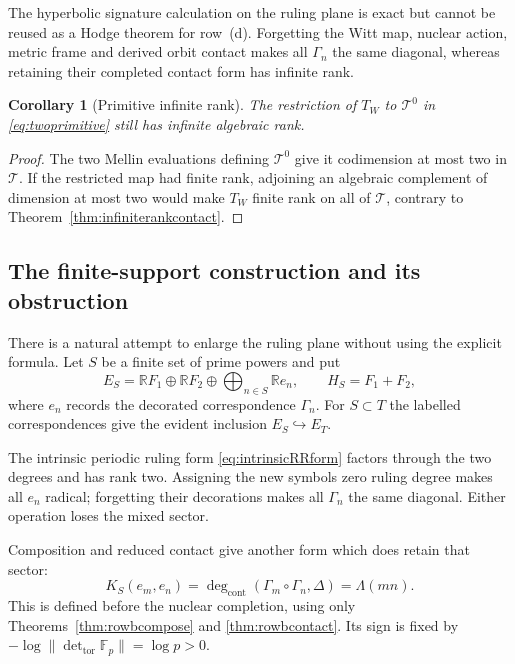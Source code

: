 \documentclass[11pt]{amsart}
\newtheorem{corollary}[theorem]{Corollary}
\theoremstyle{definition}
\theoremstyle{remark}
\begin{document}
The hyperbolic signature calculation on the ruling plane is exact but cannot
be reused as a Hodge theorem for row~(d).  Forgetting the Witt map, nuclear
action, metric frame and derived orbit contact makes all $\Gamma_n$ the
same diagonal, whereas retaining their completed contact form has infinite
rank.

\begin{corollary}[Primitive infinite rank]
\label{cor:primitiveinfiniterank}
The restriction of $T_W$ to $\mathcal T^0$ in
\eqref{eq:twoprimitive} still has infinite algebraic rank.
\end{corollary}

\begin{proof}
The two Mellin evaluations defining $\mathcal T^0$ give it codimension at
most two in $\mathcal T$.  If the restricted map had finite rank, adjoining
an algebraic complement of dimension at most two would make $T_W$ finite
rank on all of $\mathcal T$, contrary to
Theorem~\ref{thm:infiniterankcontact}.
\end{proof}

\subsection{The finite-support construction and its obstruction}

There is a natural attempt to enlarge the ruling plane without using the
explicit formula.  Let $S$ be a finite set of prime powers and put
\begin{equation}\label{eq:finitecandidate}
 E_S=\mathbb RF_1\oplus\mathbb RF_2
     \oplus\bigoplus_{n\in S}\mathbb Re_n,
 \qquad H_S=F_1+F_2,
\end{equation}
where $e_n$ records the decorated correspondence $\Gamma_n$.  For
$S\subset T$ the labelled correspondences give the evident inclusion
$E_S\hookrightarrow E_T$.

The intrinsic periodic ruling form \eqref{eq:intrinsicRRform} factors through the two degrees and has
rank two.  Assigning the new symbols zero ruling degree makes all $e_n$
radical; forgetting their decorations makes all $\Gamma_n$ the same
diagonal.  Either operation loses the mixed sector.

Composition and reduced contact give another form which does retain that
sector:
\begin{equation}\label{eq:finitecontactform}
 K_S(e_m,e_n)
 =\deg_{\mathrm{cont}}(\Gamma_m\circ\Gamma_n,\Delta)
 =\Lambda(mn).
\end{equation}
This is defined before the nuclear completion, using only
Theorems~\ref{thm:rowbcompose} and \ref{thm:rowbcontact}.  Its sign is fixed
by $-\log\|\det_{\mathrm{tor}}\mathbb F_p\|=\log p>0$.
\end{document}

